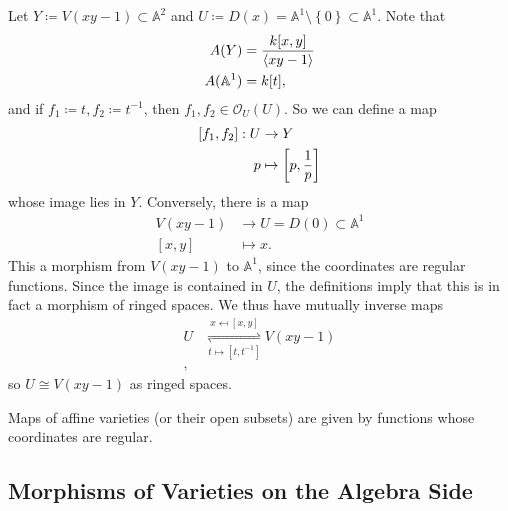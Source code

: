 \begin{example}

Let \(Y \coloneqq V(xy-1) \subset{\mathbb{A}}^2\) and
\(U\coloneqq D(x) = {\mathbb{A}}^1\setminus\left\{{0}\right\}\subset {\mathbb{A}}^1\).
Note that
\begin{align*}  
A(Y)    &= {k[x, y] \over \left\langle{xy-1}\right\rangle} \\
A({\mathbb{A}}^1) &= k[t]
,\end{align*}
and if \(f_1 \coloneqq t, f_2\coloneqq t^{-1}\), then
\(f_1, f_2 \in {\mathcal{O}}_U(U)\). So we can define a map
\begin{align*}  
{\left[ {f_1, f_2} \right]}: U &\to Y  \\
p &\mapsto {\left[ {p, {1\over p} } \right]}
\end{align*}
whose image lies in \(Y\). Conversely, there is a map
\begin{align*}  
V(xy - 1) &\to U = D(0) \subset  {\mathbb{A}}^1 \\
{\left[ {x, y} \right]} &\mapsto x
.\end{align*}
This a morphism from \(V(xy - 1)\) to \({\mathbb{A}}^1\), since the
coordinates are regular functions. Since the image is contained in
\(U\), the definitions imply that this is in fact a morphism of ringed
spaces. We thus have mutually inverse maps
\begin{align*}  
U       &\mathrel{\operatorname*{\rightleftharpoons}_{t\mapsto {\left[ {t, t^{-1} } \right]}}^{x\mapsfrom {\left[ {x, y} \right]}}} V(xy-1) \\ 
,\end{align*}
so \(U\cong V(xy-1)\) as ringed spaces.

\end{example}

\begin{slogan}

Maps of affine varieties (or their open subsets) are given by functions
whose coordinates are regular.

\end{slogan}

\hypertarget{morphisms-of-varieties-on-the-algebra-side}{%
\subsection{Morphisms of Varieties on the Algebra
Side}\label{morphisms-of-varieties-on-the-algebra-side}}

